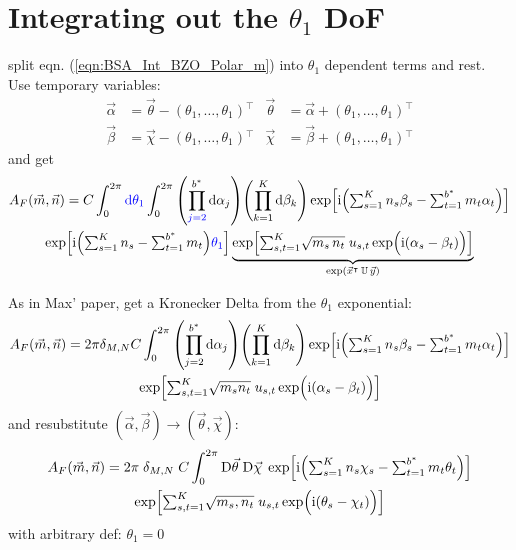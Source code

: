 \documentclass[
	english,
	a4paper,
	fontsize=10pt,
	parskip=half,
	titlepage=true,
	DIV=12,
	final
]{scrreprt}
\newcommand*{\transp}{\ensuremath{^\intercal}}
\newcommand*{\iunit}{\ensuremath{\mathrm{i}}}
\newcommand*{\DD}[1]{\ensuremath{\text{D}\vec{#1}\;}}
\begin{document}
\section{Integrating out the $\theta_1$ DoF}
split eqn. (\ref{eqn:BSA_Int_BZO_Polar_m}) into $\theta_1$ dependent terms and rest. Use temporary variables:
\begin{align}
	\vec{\alpha} &= \vec{\theta} - (\theta_1, \ldots, \theta_1)\transp
	&
	\vec{\theta} &= \vec{\alpha} + (\theta_1, \ldots, \theta_1)\transp
\\
	\vec{\beta } &= \vec{\chi  } - (\theta_1, \ldots, \theta_1)\transp
	&
	\vec{\chi  } &= \vec{\beta } + (\theta_1, \ldots, \theta_1)\transp
\end{align}
and get
\begin{multline}
	A_F(\vec{m}, \vec{n})
=
	C
	\int_{0}^{2\pi} {\color{blue} \dd{\theta_1}}
	\int_{0}^{2\pi}
		\qty( \prod_{{\color{blue} j=2}}^{b^*} \dd{\alpha_j} )
		\qty( \prod_{k=1}               ^{K}   \dd{\beta_k} )
			\exp[
				\iunit \qty(
				{\textstyle \sum_{s=1}^{K}   n_s \beta _s}   -
				{\textstyle \sum_{t=1}^{b^*} m_t \alpha_t}
			)]
\\
	\exp[
		\iunit \qty(
			{\textstyle \sum_{s=1}^{K}   n_s}   -
			{\textstyle \sum_{t=1}^{b^*} m_t}
		)
		{\color{blue} \theta_1}
	]
	\underbrace{
	\exp[
		{\textstyle \sum_{s,t=1}^{K} }
			\sqrt{m_s \, n_t} \;
			u_{s,t}
			\exp(\Big. \iunit(\alpha_s - \beta_t) )
	]}_{\exp( \vec{x}\transp \, \mathbb{U} \, \vec{y})}
\end{multline}

As in Max' paper, get a Kronecker Delta from the $\theta_1$ exponential:
\begin{multline}	
	A_F(\vec{m}, \vec{n})
=
	2\pi \delta_{M,N} C
	\int_{0}^{2\pi}
		\qty( \prod_{j=2}^{b^*} \dd{\alpha_j} )
		\qty( \prod_{k=1}^{K}   \dd{\beta _k} )
	\exp[
		\iunit \qty(
		{\textstyle \sum_{s=1}^{K}   n_s \beta _s}   -
		{\textstyle \sum_{t=1}^{b^*} m_t \alpha_t}
	)]
\\
	\exp[
		{\textstyle \sum_{s,t=1}^{K} }
			\sqrt{m_s n_t} \;
			u_{s,t}
			\exp(\Big. \iunit(\alpha_s - \beta_t) )
	]
\end{multline}
and resubstitute $(\vec{\alpha}, \vec{\beta}) \to (\vec{\theta}, \vec{\chi})$:
\begin{multline}	
	A_F(\vec{m}, \vec{n})
=
	2\pi \; \delta_{M,N} \; C
	\int_{0}^{2\pi}
		\DD{\theta} \DD{\chi}
	\exp[
		\iunit \qty(
		{\textstyle \sum_{s=1}^{K}   n_s \chi  _s}   -
		{\textstyle \sum_{t=1}^{b^*} m_t \theta_t}
	)]
\\
	\exp[
		{\textstyle \sum_{s,t=1}^{K} }
			\sqrt{m_s, n_t} \;
			u_{s,t}
			\exp(\Big. \iunit(\theta_s - \chi_t) )
	]
\end{multline}
with arbitrary def: $\theta_1 = 0$
\end{document}
